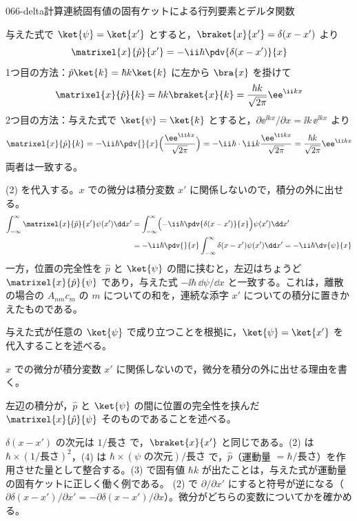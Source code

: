\documentclass[uplatex,dvipdfmx,a4paper,11pt]{jsarticle}
\begin{document}
\begin{mondai}{066-delta}{計算}{連続固有値の固有ケットによる行列要素とデルタ関数}
\begin{tadashii}
 与えた式で $\ket{\psi}=\ket{x'}$ とすると，$\braket{x}{x'}=\delta(x-x')$ より
\[ \matrixel{x}{\hat{p}}{x'}=-\ii\hbar\pdv{\delta(x-x')}{x} \]
 1つ目の方法：$\hat{p}\ket{k}=\hbar k\ket{k}$ に左から $\bra{x}$ を掛けて
\[ \matrixel{x}{\hat{p}}{k}=\hbar k\braket{x}{k}=\frac{\hbar k}{\sqrt{2\pi}}\ee^{\ii kx} \]
2つ目の方法：与えた式で $\ket{\psi}=\ket{k}$ とすると，$\partial\ee^{\ii kx}/\partial x=\ii k\,\ee^{\ii kx}$ より
\[ \matrixel{x}{\hat{p}}{k}=-\ii\hbar\pdv{}{x}\Bigl(\frac{\ee^{\ii kx}}{\sqrt{2\pi}}\Bigr)=-\ii\hbar\cdot\ii k\frac{\ee^{\ii kx}}{\sqrt{2\pi}}=\frac{\hbar k}{\sqrt{2\pi}}\ee^{\ii kx} \]
両者は一致する。

 (2) を代入する。$x$ での微分は積分変数 $x'$ に関係しないので，積分の外に出せる。
\begin{align*}
\int_{-\infty}^{\infty}\matrixel{x}{\hat{p}}{x'}\psi(x')\dd x'
&=\int_{-\infty}^{\infty}\Bigl(-\ii\hbar\pdv{\delta(x-x')}{x}\Bigr)\psi(x')\dd x'\\
&=-\ii\hbar\pdv{}{x}\int_{-\infty}^{\infty}\delta(x-x')\psi(x')\dd x'=-\ii\hbar\dv{\psi}{x}
\end{align*}
一方，位置の完全性を $\hat{p}$ と $\ket{\psi}$ の間に挟むと，左辺はちょうど $\matrixel{x}{\hat{p}}{\psi}$ であり，与えた式 $-\ii\hbar\,\dd\psi/\dd x$ と一致する。これは，離散の場合の $A_{nm}c_{m}$ の $m$ についての和を，連続な添字 $x'$ についての積分に置きかえたものである。
\begin{ronten}
  \item {} 与えた式が任意の $\ket{\psi}$ で成り立つことを根拠に，$\ket{\psi}=\ket{x'}$ を代入することを述べる。
  \item {} $x$ での微分が積分変数 $x'$ に関係しないので，微分を積分の外に出せる理由を書く。
  \item {} 左辺の積分が，$\hat{p}$ と $\ket{\psi}$ の間に位置の完全性を挟んだ $\matrixel{x}{\hat{p}}{\psi}$ そのものであることを述べる。
\end{ronten}
\kenzan $\delta(x-x')$ の次元は $1/\text{長さ}$ で，$\braket{x}{x'}$ と同じである。(2) は $\hbar\times(1/\text{長さ})^{2}$，(4) は $\hbar\times(\psi\text{ の次元})/\text{長さ}$ で，$\hat{p}$（運動量 $=\hbar/\text{長さ}$）を作用させた量として整合する。(3) で固有値 $\hbar k$ が出たことは，与えた式が運動量の固有ケットに正しく働く例である。
\tsumazuki (2) で $\partial/\partial x'$ にすると符号が逆になる（$\partial\delta(x-x')/\partial x'=-\partial\delta(x-x')/\partial x$）。微分がどちらの変数についてかを確かめる。
\end{tadashii}
\end{mondai}
\end{document}
